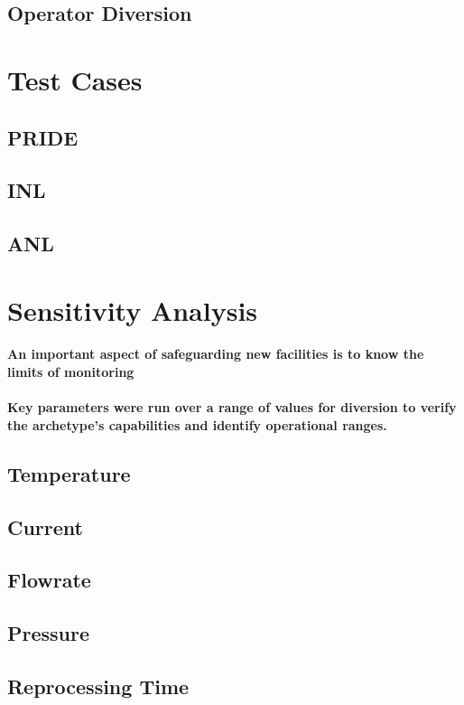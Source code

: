 \subsection{Operator Diversion}

\section{Test Cases}

\subsection{PRIDE}

\subsection{INL}

\subsection{ANL}

\section{Sensitivity Analysis}

\paragraph{An important aspect of safeguarding new facilities is to know the limits of monitoring}

\paragraph{Key parameters were run over a range of values for diversion to verify the archetype's capabilities and identify operational ranges.}

\subsection{Temperature}

\subsection{Current}

\subsection{Flowrate}

\subsection{Pressure}

\subsection{Reprocessing Time}